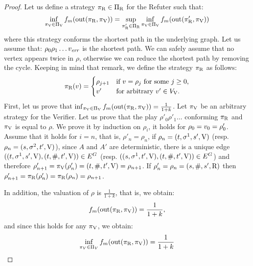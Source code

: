 \begin{proof}
	Let us define a strategy $\pi_{\mathrm{R}} \in \Pi_{\mathrm{R}}$ for the Refuter such that:
\[
	\inf_{\pi_{\mathrm{V}} \in \Pi_{\mathrm{V}}} f_m(\operatorname{out}(\pi_{\mathrm{R}}, \pi_{\mathrm{V}})) = \sup_{\pi_{\mathrm{R}}' \in \Pi_{\mathrm{R}}} \inf_{\pi_{\mathrm{V}} \in \Pi_{\mathrm{V}}} f_m( \operatorname{out}(\pi_{\mathrm{R}}',\pi_{\mathrm{V}}))
\]	
	where this strategy conforms the shortest path in the underlying graph. Let us assume that: 
$\rho_0 \rho_1 \dots v_{\mathit{err}}$ is the shortest path. We can safely assume that no vertex appears twice in $\rho$, otherwise we can reduce the shortest path by removing the cycle.
	Keeping in mind that remark, we define the strategy $\pi_{\mathrm{R}}$ as follows:
\[
	\pi_{\mathrm{R}}(v) = \begin{cases}
								\rho_{j+1} & \text{if $v = \rho_j$ for some $j \geq 0$,} \\
								v' & \text{for arbitrary $v' \in V_{\mathrm{V}}$.}
						   \end{cases}
\] 
First, let us prove that $\inf_{\pi_{\mathrm{V}} \in \Pi_{\mathrm{V}}} f_m (\operatorname{out}(\pi_{\mathrm{R}}, \pi_{\mathrm{V}})) = \frac{1}{1+k}$. Let $\pi_{\mathrm{V}}$ be an arbitrary strategy for the Verifier. Let us prove that
the play $\rho'_0 \rho'_1 \dots$ conforming $\pi_{\mathrm{R}}$ and $\pi_{\mathrm{V}}$ is equal to $\rho$. We prove it by induction 
on $\rho_i$, it holds for $\rho_0 = v_0 = \rho'_0$. Assume that it holds 
for $i=n$, that is, $\rho'_n = \rho_n$, if $\rho_n = (t, \sigma^1, s', \mathrm{V})$ (resp.  $\rho_n = (s, \sigma^2, t', \mathrm{V})$), since $A$ and $A'$ are deterministic, there is a unique edge $((t, \sigma^1, s', \mathrm{V}), (t, \#, t', \mathrm{V})) \in E^G$ (resp. $((s, \sigma^1, t', \mathrm{V}), (t, \#, t', \mathrm{V})) \in E^G$) and therefore $\rho'_{n+1} = \pi_{\mathrm{V}}( \rho'_n) = (t, \#, t', \mathrm{V}) = \rho_{n+1}$. If 
$\rho'_n = \rho_n = (s, \#, s', \mathrm{R})$ then $\rho'_{n+1} = \pi_{\mathrm{R}}(\rho'_n) = \pi_{\mathrm{R}}(\rho_n) = \rho_{n+1}$. 
	
	In addition,  the valuation of $\rho$ is $\frac{1}{1+k}$, that is, we obtain:
\begin{equation} \label{eq1}
\begin{split}
 f_m (\operatorname{out}(\pi_{\mathrm{R}}, \pi_{\mathrm{V}}))  =  \frac{1}{1+k},
\end{split}
\end{equation}	
and since this holds for any $\pi_{\mathrm{V}}$, we obtain:
\begin{equation} \label{eq1}
\begin{split}
\inf_{\pi_V \in \Pi_V} f_m (\operatorname{out}(\pi_{\mathrm{R}}, \pi_{\mathrm{V}}))  =  \frac{1}{1+k}
\end{split}
\end{equation}


\end{proof}
